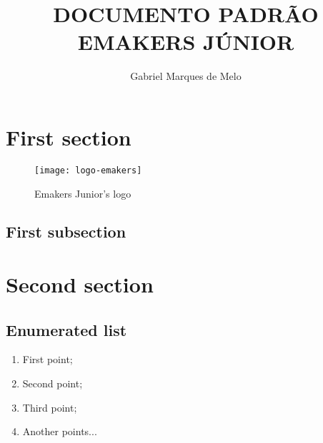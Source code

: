 






\def\titulo{DOCUMENTO PADRÃO EMAKERS JÚNIOR}

\title{\titulo}
\author{Gabriel Marques de Melo}
    

    \maketitle
    \thispagestyle{first_page}
    \pagestyle{all_pages}

    \section{First section}\label{sec:firstSection}
        \lipsum[1]

        \begin{figure}[!htb]
            \centering
            \texttt{[image: logo-emakers]}
            \caption{Emakers Junior's logo}
            \label{logo-emakers}
        \end{figure}

        \subsection{First subsection}\label{subsec:firstSubsection}
        \lipsum[1]

    \section{Second section}\label{sec:secondSection}
        \lipsum[1]
        \subsection{Enumerated list}

        \begin{enumerate}[label=(\roman*)]
            \item First point;
            \item Second point;
            \item Third point;
            \item Another points...
        \end{enumerate}



